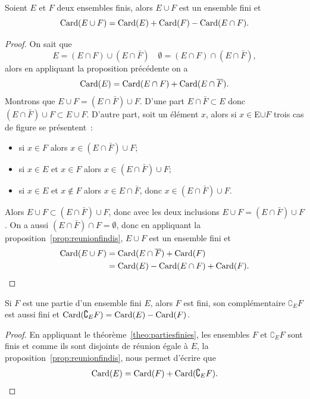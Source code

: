   \begin{prop}
    Soient \(E\) et \(F\) deux ensembles finis, alors \(E\cup F\) est un ensemble fini et
    \begin{equation}
    \operatorname{Card}(E\cup F)=\operatorname{Card}(E)+\operatorname{Card}(F)-\operatorname{Card}(E\cap F).
  \end{equation}
\end{prop}
\begin{proof}
  On sait que 
  \begin{equation}
    E=(E\cap F)\cup (E\cap \bar{F}) \quad \emptyset=(E\cap F)\cap (E\cap \bar{F}),
  \end{equation} 
  alors en appliquant la proposition précédente on a
  \begin{equation}
    \operatorname{Card}(E)=\operatorname{Card}(E\cap F)+\operatorname{Card}(E\cap \overline{F}).
  \end{equation}
  Montrons que \(E\cup F =(E\cap \bar{F}) \cup F\). D'une part \(E \cap \bar{F} \subset E\) donc \((E\cap \bar{F}) \cup F \subset E\cup F\). D'autre part, soit un élément \(x\), alors si \(x \in \)E\( \cup F\) trois cas de figure se présentent~:
  \begin{itemize}
  \item si \(x\in F\) alors \(x \in (E\cap \bar{F}) \cup F\);
  \item si \(x \in E\) et \(x \in F\) alors \(x \in (E\cap \bar{F}) \cup F\);
  \item si \(x \in E\) et \(x \notin F\) alors \(x \in E\cap \bar{F}\), donc \(x \in (E\cap \bar{F}) \cup F\).
  \end{itemize}
  Alors \(E\cup F \subset (E \cap \bar{F})\cup F\), donc avec les deux inclusions \(E\cup F =(E\cap \bar{F}) \cup F\). On a aussi \((E\cap \bar{F})\cap F=\emptyset\), donc en appliquant la proposition~\ref{prop:reunionfindis}, \(E\cup F\) est un ensemble fini et
  \begin{align}
    \operatorname{Card}(E\cup F)&=\operatorname{Card}(E\cap \overline{F})+\operatorname{Card}(F)\\ &=\operatorname{Card}(E) - \operatorname{Card}(E\cap F)+\operatorname{Card}(F).
  \end{align}
\end{proof}
\begin{prop}
  Si \(F\) est une partie d'un ensemble fini \(E\), alors \(F\) est fini, son complémentaire \(\complement_E F\) est aussi fini et \(\operatorname{Card}(\complement_E F)=\operatorname{Card}(E)-\operatorname{Card}(F)\).
\end{prop}
\begin{proof}
  En appliquant le théorème~\ref{theo:partiesfinies}, les ensembles \(F\) et \(\complement_E F\) sont finis et comme ils sont disjoints de réunion égale à \(E\), la proposition~\ref{prop:reunionfindis}, nous permet d'écrire que
  \begin{equation}
    \operatorname{Card}(E)=\operatorname{Card}(F)+\operatorname{Card}(\complement_E F).
  \end{equation}
\end{proof}
